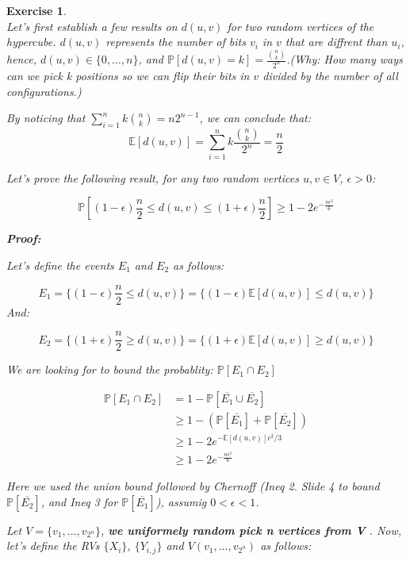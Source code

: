 \documentclass{article}
\newtheorem{exo}{Exercise}
\def\P{\mathbb{P}}
\def\E{\mathbb{E}}
\begin{document}
\begin{exo}{\ \\}
    Let's first establish a few results on $d(u,v)$ for two random vertices of the hypercube. $d(u,v)$ represents the number of bits $v_i$ in $v$ that are diffrent than $u_i$, hence, $d(u,v) \in \{0, \dots, n\}$, and $\P[d(u,v) = k] = \frac{\binom{n}{k}}{2^n}$.(Why: How many ways can we pick k positions so we can flip their bits in $v$ divided by the number of all configurations.)

    By noticing that $\sum^{n}_{i=1} k \binom{n}{k} = n 2^{n-1}$, we can conclude that:
    \[
\E[d(u,v)] = \sum^{n}_{i=1} k \frac{\binom{n}{k}}{2^n} = \frac{n}{2}
    \]
 

    Let's prove the following result, for any two random vertices $u,v \in V    $, $\epsilon > 0$:

    \[
        \P\left[(1-\epsilon)\frac{n}{2} \leq d(u,v) \leq (1+\epsilon)\frac{n}{2}\right]
        \geq 1 - 2 e^{-\frac{n \epsilon^2 }{6}}  
    \]

\begin{tcolorbox}
   \textbf{Proof:}  

    Let's define the events $E_1$ and $E_2$ as follows:


    \[
        E_1 = \{ (1-\epsilon) \frac{n}{2} \leq d(u,v)\} 
        = \{ (1-\epsilon) \E[d(u,v)] \leq d(u,v)\}
    \]
    And:

    \[
        E_2    = \{ (1+\epsilon) \frac{n}{2} \geq d(u,v)\} 
        = \{(1+\epsilon) \E[d(u,v)] \geq d(u,v)\}    
    \]

We are looking for to bound the probablity: $\P[E_1 \cap E_2]$

\begin{align*}
    \P[E_1 \cap E_2] 
    &= 1 - \P[\overline{E_1} \cup \overline{E_2}] \\
    &\geq 1 - (\P[\overline{E_1}] +  \P[\overline{E_2}]) \\
    &\geq  1 - 2 e^{-\E[d(u,v)]\epsilon^2 / 3} \\
    &\geq  1 - 2 e^{-\frac{n \epsilon^2 }{6}} 
\end{align*}

Here we used the union bound followed by Chernoff 
(Ineq 2. Slide 4 to bound $\P[\overline{E_2}]$, and Ineq 3 for $\P[\overline{E_1}]$), assumig $0 < \epsilon < 1$.
\end{tcolorbox}


Let $V = \{v_1, \dots, v_{2^n}\}$, \textbf{we uniformely random pick n vertices from V }.  Now, let's define the RVs $\{X_i\}$, $\{Y_{i,j}\}$ and $V(v_1, \dots, v_{2^n})$ as follows:


\end{exo}
\end{document}
